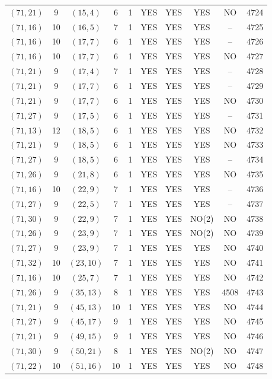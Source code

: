 \begin{longtable}{|c|c|c|c|c|c|c|c|c|c|}
$(71, 21)$ & 9 & $(15, 4)$ & 6 & 1 & YES & YES & YES & NO & 4724\\
$(71, 16)$ & 10 & $(16, 5)$ & 7 & 1 & YES & YES & YES & -- & 4725\\
$(71, 16)$ & 10 & $(17, 7)$ & 6 & 1 & YES & YES & YES & -- & 4726\\
$(71, 16)$ & 10 & $(17, 7)$ & 6 & 1 & YES & YES & YES & NO & 4727\\
$(71, 21)$ & 9 & $(17, 4)$ & 7 & 1 & YES & YES & YES & -- & 4728\\
$(71, 21)$ & 9 & $(17, 7)$ & 6 & 1 & YES & YES & YES & -- & 4729\\
$(71, 21)$ & 9 & $(17, 7)$ & 6 & 1 & YES & YES & YES & NO & 4730\\
$(71, 27)$ & 9 & $(17, 5)$ & 6 & 1 & YES & YES & YES & -- & 4731\\
$(71, 13)$ & 12 & $(18, 5)$ & 6 & 1 & YES & YES & YES & NO & 4732\\
$(71, 21)$ & 9 & $(18, 5)$ & 6 & 1 & YES & YES & YES & NO & 4733\\
$(71, 27)$ & 9 & $(18, 5)$ & 6 & 1 & YES & YES & YES & -- & 4734\\
$(71, 26)$ & 9 & $(21, 8)$ & 6 & 1 & YES & YES & YES & NO & 4735\\
$(71, 16)$ & 10 & $(22, 9)$ & 7 & 1 & YES & YES & YES & -- & 4736\\
$(71, 27)$ & 9 & $(22, 5)$ & 7 & 1 & YES & YES & YES & -- & 4737\\
$(71, 30)$ & 9 & $(22, 9)$ & 7 & 1 & YES & YES & NO(2) & NO & 4738\\
$(71, 26)$ & 9 & $(23, 9)$ & 7 & 1 & YES & YES & NO(2) & NO & 4739\\
$(71, 27)$ & 9 & $(23, 9)$ & 7 & 1 & YES & YES & YES & NO & 4740\\
$(71, 32)$ & 10 & $(23, 10)$ & 7 & 1 & YES & YES & YES & NO & 4741\\
$(71, 16)$ & 10 & $(25, 7)$ & 7 & 1 & YES & YES & YES & NO & 4742\\
$(71, 26)$ & 9 & $(35, 13)$ & 8 & 1 & YES & YES & YES & 4508 & 4743\\
$(71, 21)$ & 9 & $(45, 13)$ & 10 & 1 & YES & YES & YES & NO & 4744\\
$(71, 27)$ & 9 & $(45, 17)$ & 9 & 1 & YES & YES & YES & NO & 4745\\
$(71, 21)$ & 9 & $(49, 15)$ & 9 & 1 & YES & YES & YES & NO & 4746\\
$(71, 30)$ & 9 & $(50, 21)$ & 8 & 1 & YES & YES & NO(2) & NO & 4747\\
$(71, 22)$ & 10 & $(51, 16)$ & 10 & 1 & YES & YES & YES & NO & 4748\\

\end{longtable}
